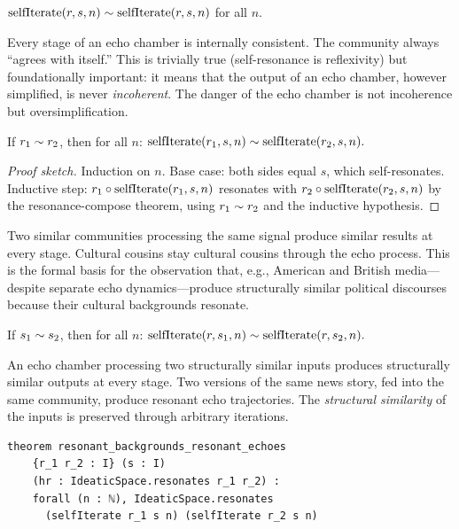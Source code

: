 \begin{theorem}
\label{thm:echo-self-resonance}
$\mathrm{selfIterate}(r,s,n) \sim \mathrm{selfIterate}(r,s,n)$ for all $n$.
\end{theorem}

Every stage of an echo chamber is internally consistent.  The community
always ``agrees with itself.''  This is trivially true (self-resonance is
reflexivity) but foundationally important: it means that the output of an
echo chamber, however simplified, is never \emph{incoherent}.  The danger
of the echo chamber is not incoherence but oversimplification.

\begin{theorem}
\label{thm:resonant-backgrounds}
If $r_1\sim r_2$, then for all $n$:
$\mathrm{selfIterate}(r_1, s, n) \sim \mathrm{selfIterate}(r_2, s, n).$
\end{theorem}

\begin{proof}[Proof sketch]
Induction on $n$.  Base case: both sides equal $s$, which self-resonates.
Inductive step: $r_1\circ\mathrm{selfIterate}(r_1,s,n)$ resonates with
$r_2\circ\mathrm{selfIterate}(r_2,s,n)$ by the resonance-compose
theorem, using $r_1\sim r_2$ and the inductive hypothesis.
\end{proof}

Two similar communities processing the same signal produce similar results
at every stage.  Cultural cousins stay cultural cousins through the echo
process.  This is the formal basis for the observation that, e.g., American
and British media---despite separate echo dynamics---produce structurally
similar political discourses because their cultural backgrounds resonate.

\begin{theorem}
\label{thm:resonant-signals}
If $s_1\sim s_2$, then for all $n$:
$\mathrm{selfIterate}(r, s_1, n) \sim \mathrm{selfIterate}(r, s_2, n).$
\end{theorem}

An echo chamber processing two structurally similar inputs produces
structurally similar outputs at every stage.  Two versions of the same news
story, fed into the same community, produce resonant echo trajectories.
The \emph{structural similarity} of the inputs is preserved through
arbitrary iterations.

\begin{lstlisting}[caption={Resonant backgrounds theorem in Lean~4.}]
theorem resonant_backgrounds_resonant_echoes
    {r_1 r_2 : I} (s : I)
    (hr : IdeaticSpace.resonates r_1 r_2) :
    forall (n : ℕ), IdeaticSpace.resonates
      (selfIterate r_1 s n) (selfIterate r_2 s n)
\end{lstlisting}


